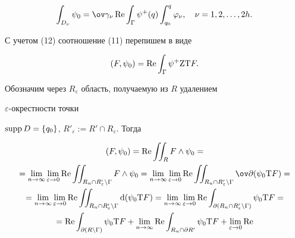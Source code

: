 \begin{pf}
\begin{equation}
\int_{D_\nu}\psi_0=\ov\gamma_\nu\re\int_\Gamma 


\psi^+(q)\int^q_{q_0}\varphi_\nu,\quad \nu=1,2,\dotsc,2h. 


\end{equation} 


 


С учетом (12) соотношение (11) перепишем в виде 


$$ 


(F,\psi_0)=\re\int_\Gamma \psi^+{\mathrm Z}{\mathrm T}F. 


$$ 


Обозначим через $R_\varepsilon$ область, получаемую из $R$ удалением 


$\varepsilon$-окрестности точки 


$\operatorname{supp} D=\{q_0\}$, $R'_\varepsilon:=R'\cap R_\varepsilon$. Тогда 


\begin{multline*} 


(F,\psi_0)=\re\iint_R F\wedge\psi_0= \\ 


% 


=\lim_{n\to\infty}\lim_{\varepsilon\to0}\re 


\iint_{R_n\cap R'_\varepsilon\setminus\Gamma}F\wedge\psi_0= 


\lim_{n\to\infty}\lim_{\varepsilon\to0} 


\re\iint_{R_n\cap R'_\varepsilon\setminus\Gamma} 


\ov\partial(\psi_0{\mathrm T}F)= \\ 


% 


=\lim_{n\to\infty}\lim_{\varepsilon\to0} 


\re \iint_{R_n\cap R'_\varepsilon\setminus\Gamma} 


{\mathrm d}(\psi_0{\mathrm T}F) 


=\lim_{n\to\infty}\lim_{\varepsilon\to0} 


\re \int_{\partial( R_n\cap R'_\varepsilon\setminus\Gamma)} 


\psi_0{\mathrm T}F = \\ 


% 


=\re\int_{\partial(R\setminus\Gamma)}\psi_0{\mathrm T}F+ 


\lim_{n\to\infty}\re\int_{R_n\cap\partial R'} 


\psi_0{\mathrm T}F+\lim_{\varepsilon\to0}\re 



\end{multline*}
\end{pf}
